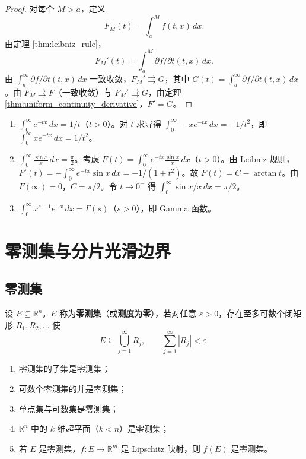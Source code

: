 \begin{proof}
对每个 $M > a$，定义
\[
F_M(t) = \int_a^M f(t, x) \, dx.
\]
由定理 \ref{thm:leibniz_rule}，
\[
F_M'(t) = \int_a^M \partial f/\partial t(t, x) \, dx.
\]由 $\int_a^{\infty} \partial f/\partial t(t, x) \, dx$ 一致收敛，$F_M' \rightrightarrows G$，其中 $G(t) = \int_a^{\infty} \partial f/\partial t(t, x) \, dx$。由 $F_M \rightrightarrows F$（一致收敛）与 $F_M' \rightrightarrows G$，由定理 \ref{thm:uniform_continuity_derivative}，$F' = G$。
\end{proof}

\begin{example}[含参积分的经典例子]\label{ex:parametric_integral_examples}
\begin{enumerate}[label=(\roman*)]
    \item $\int_0^{\infty} e^{-tx} \, dx = 1/t$（$t > 0$）。对 $t$ 求导得 $\int_0^{\infty} -x e^{-tx} \, dx = -1/t^2$，即 $\int_0^{\infty} x e^{-tx} \, dx = 1/t^2$。
    \item $\int_0^{\infty} \frac{\sin x}{x} \, dx = \frac{\pi}{2}$。考虑 $F(t) = \int_0^{\infty} e^{-tx} \frac{\sin x}{x} \, dx$（$t > 0$）。由 Leibniz 规则，$F'(t) = -\int_0^{\infty} e^{-tx} \sin x \, dx = -1/(1 + t^2)$。故 $F(t) = C - \arctan t$。由 $F(\infty) = 0$，$C = \pi/2$。令 $t \to 0^+$ 得 $\int_0^{\infty} \sin x / x \, dx = \pi/2$。
    \item $\int_0^{\infty} x^{s-1} e^{-x} \, dx = \Gamma(s)$（$s > 0$），即 Gamma 函数。
\end{enumerate}
\end{example}

\section{零测集与分片光滑边界}

\subsection{零测集}

\begin{definition}[零测集]\label{def:null_set}
设 $E \subseteq \mathbb{R}^n$。$E$ 称为\textbf{零测集}（或\textbf{测度为零}），若对任意 $\varepsilon > 0$，存在至多可数个闭矩形 $R_1, R_2, \dots$ 使
\[
E \subseteq \bigcup_{j=1}^{\infty} R_j, \qquad \sum_{j=1}^{\infty} |R_j| < \varepsilon.
\]
\end{definition}

\begin{proposition}[零测集的基本性质]\label{prop:null_set_properties}
\begin{enumerate}[label=(\roman*)]
    \item 零测集的子集是零测集；
    \item 可数个零测集的并是零测集；
    \item 单点集与可数集是零测集；
    \item $\mathbb{R}^n$ 中的 $k$ 维超平面（$k < n$）是零测集；
    \item 若 $E$ 是零测集，$f: E \to \mathbb{R}^m$ 是 Lipschitz 映射，则 $f(E)$ 是零测集。
\end{enumerate}
\end{proposition}

